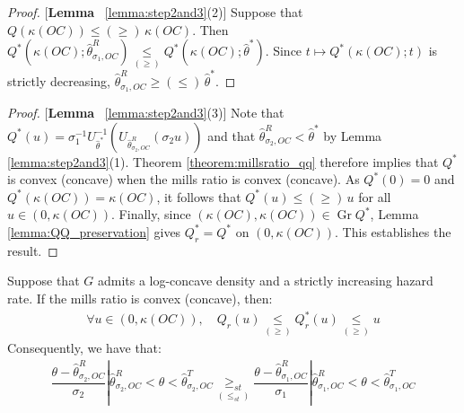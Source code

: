 \begin{proof}{[\textbf{Lemma} ~\ref{lemma:step2and3}(2)]} Suppose that $Q(\kappa(OC))\leq(\geq)\,\kappa(OC)$. Then $Q^*(\kappa(OC);\hat{\theta}^R_{\sigma_1,OC})\underset{(\geq)}{\leq}Q^*(\kappa(OC);\hat{\theta}^*)$. Since $t\mapsto Q^*(\kappa(OC);t)$ is strictly decreasing, $\hat{\theta}^R_{\sigma_1,OC}\geq(\leq)\,\hat{\theta}^*$.
\end{proof}

\begin{proof}{[\textbf{Lemma} ~\ref{lemma:step2and3}(3)]} Note that $Q^*(u)=\sigma_1^{-1}U^{-1}_{\hat{\theta}^*}(U_{\hat{\theta}^R_{\sigma_2,OC}}(\sigma_2u))$ and that $\hat{\theta}^R_{\sigma_2,OC}<\hat{\theta}^*$ by Lemma \ref{lemma:step2and3}(1). Theorem \ref{theorem:millsratio_qq} therefore implies that $Q^*$ is convex (concave) when the mills ratio is convex (concave). As $Q^*(0)=0$ and $Q^*(\kappa(OC))=\kappa(OC)$, it follows that $Q^*(u)\leq(\geq)\,u$ for all $u\in(0,\kappa(OC))$. Finally, since $(\kappa(OC),\kappa(OC))\in\operatorname{Gr}Q^*$, Lemma \ref{lemma:QQ_preservation} gives $Q^*_r=Q^*$ on $(0,\kappa(OC))$. This establishes the result.
\end{proof}

\begin{lemma}\label{lemma:step4and5} 
Suppose that $G$ admits a log-concave density and a strictly increasing hazard rate. If the mills ratio is convex (concave), then:
\begin{align*}
    \forall u\in (0,\kappa(OC)),\quad Q_r(u) \underset{(\geq)}{\leq} Q_r^*(u) \underset{(\geq)}{\leq} u  
\end{align*}
Consequently, we have that:
\begin{align*}
    \dfrac{\theta - \hat{\theta}^R_{\sigma_2,OC}}{\sigma_2}|\hat{\theta}^R_{\sigma_2,OC}<\theta < \hat{\theta}^T_{\sigma_2,OC} \underset{(\leq_{st})}{\geq_{st}} \dfrac{\theta - \hat{\theta}^R_{\sigma_1,OC}}{\sigma_1}|\hat{\theta}^R_{\sigma_1,OC}<\theta < \hat{\theta}^T_{\sigma_1,OC} 
\end{align*}
\end{lemma}


